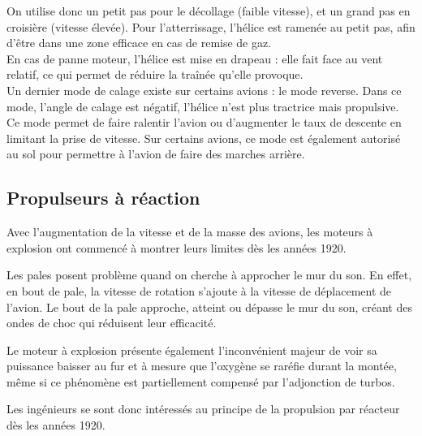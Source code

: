 	     On utilise donc un petit pas pour le décollage (faible vitesse), et un grand pas en croisière (vitesse élevée). Pour l'atterrissage, l'hélice est ramenée au petit pas, afin d'être dans une zone efficace en cas de remise de gaz.\\
	     
	     En cas de panne moteur, l'hélice est mise en drapeau : elle fait face au vent relatif, ce qui permet de réduire la traînée qu'elle provoque. \\
	     
	     Un dernier mode de calage existe sur certains avions : le mode reverse. Dans ce mode, l'angle de calage est négatif, l'hélice n'est plus tractrice mais propulsive. Ce mode permet de faire ralentir l'avion ou d'augmenter le taux de descente en limitant la prise de vitesse. Sur certains avions, ce mode est également autorisé au sol pour permettre à l'avion de faire des marches arrière.
		
	
	\subsection{Propulseurs à réaction}
	Avec l'augmentation de la vitesse et de la masse des avions, les moteurs à explosion ont commencé à montrer leurs limites dès les années 1920. 
	
	Les pales posent problème quand on cherche à approcher le mur du son. En effet, en bout de pale, la vitesse de rotation s'ajoute à la vitesse de déplacement de l'avion. Le bout de la pale approche, atteint ou dépasse le mur du son, créant des ondes de choc qui réduisent leur efficacité.
	
	Le moteur à explosion présente également l'inconvénient majeur de voir sa puissance baisser au fur et à mesure que l'oxygène se raréfie durant la montée, même si ce phénomène est partiellement compensé par l'adjonction de turbos.
	
	Les ingénieurs se sont donc intéressés au principe de la propulsion par réacteur dès les années 1920.
	
	
